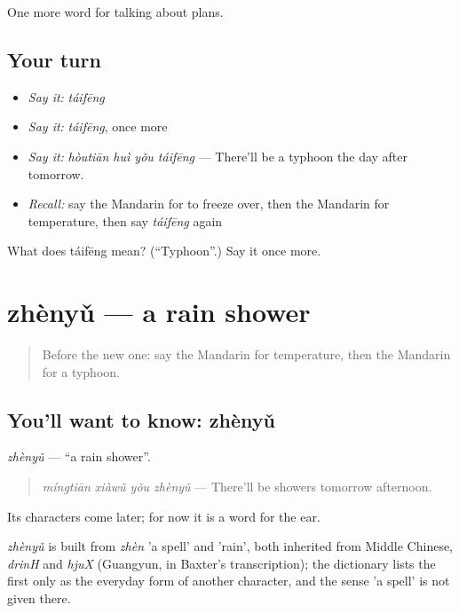 \begin{grammarlens}[title={What you've built}]
One more word for talking about plans.
\end{grammarlens}

\subsection*{Your turn}
\begin{itemize}
\raggedright
  \item \emph{Say it:} \emph{táifēng}
  \item \emph{Say it:} \emph{táifēng}, once more
  \item \emph{Say it:} \emph{hòutiān huì yǒu táifēng} — There'll be a typhoon the day after tomorrow.
  \item \emph{Recall:} say the Mandarin for to freeze over, then the Mandarin for temperature, then say \emph{táifēng} again
\end{itemize}

\begin{tcolorbox}[breakable,colback=teal!4,colframe=teal!35!black,title={Before you move on}]
What does táifēng mean? (\textquotedblleft{}Typhoon\textquotedblright{}.) Say it once more.
\end{tcolorbox}
\section[zhènyǔ]{zhènyǔ — a rain shower}

\label{lesson:ZH-C244-zhenyu}



\begin{quote}
Before the new one: say the Mandarin for temperature, then the Mandarin for a typhoon.
\end{quote}

\subsection*{You'll want to know: zhènyǔ}
\emph{zhènyǔ} — \textquotedblleft{}a rain shower\textquotedblright{}.

\begin{quote}
\emph{míngtiān xiàwǔ yǒu zhènyǔ} — There'll be showers tomorrow afternoon.
\end{quote}

Its characters come later; for now it is a word for the ear.

\begin{cousinweb}
\emph{zhènyǔ} is built from \emph{zhèn} 'a spell' and  'rain', both inherited from Middle Chinese, \emph{drinH} and \emph{hjuX} (Guangyun, in Baxter's transcription); the dictionary lists the first only as the everyday form of another character, and the sense 'a spell' is not given there.
\end{cousinweb}

